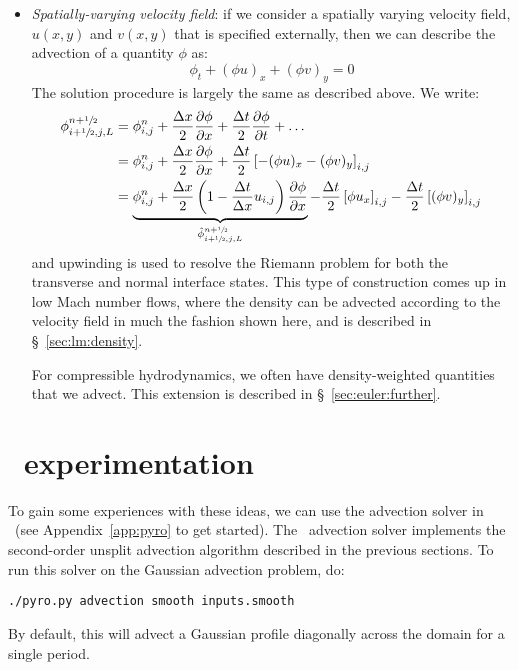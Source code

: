 \begin{itemize}
\item {\em Spatially-varying velocity field}: if we consider a spatially
  varying velocity field, $u(x,y)$ and $v(x,y)$ that is specified externally,
  then we can describe the advection of a quantity $\phi$ as:
  \begin{equation}
  \phi_t + (\phi u)_x + (\phi v)_y = 0
  \end{equation}
  The solution procedure is largely the same as described above.  We write:
\begin{align}
\phi_{i+\myhalf,j,L}^{n+\myhalf} &= \phi_{i,j}^n +
   \frac{\Delta x}{2} \frac{\partial \phi}{\partial x} +
   \frac{\Delta t}{2} \frac{\partial \phi}{\partial t} + \ldots \nonumber \\
%
 &= \phi_{i,j}^n +
    \frac{\Delta x}{2} \frac{\partial \phi}{\partial x} +
    \frac{\Delta t}{2} \left [ -(\phi u)_x -(\phi v)_y \right ]_{i,j} \nonumber\\
%
 &= \underbrace{\phi_{i,j}^n +
   \frac{\Delta x}{2} \left ( 1 - \frac{\Delta t}{\Delta x} u_{i,j} \right )
        \frac{\partial \phi}{\partial x}}_{\hat{\phi}_{i+\myhalf,j,L}^{n+\myhalf}}
   - \frac{\Delta t}{2} \left [\phi u_x \right ]_{i,j}
   - \frac{\Delta t}{2} \left [ (\phi v)_y \right ]_{i,j}
\end{align}
  and upwinding is used to resolve the Riemann problem for both the
  transverse and normal interface states.  This type of construction
  comes up in low Mach number flows, where the density can be advected
  according to the velocity field in much the fashion shown here, and
  is described in \S~\ref{sec:lm:density}.


  For compressible hydrodynamics, we often have density-weighted quantities
  that we advect.  This extension is described in \S~\ref{sec:euler:further}.

\end{itemize}


\section{\pyro\ experimentation}

To gain some experiences with these ideas, we can use the advection
solver in \pyro\ (see Appendix~\ref{app:pyro} to get started).
The \pyro\ advection solver implements the second-order unsplit
advection algorithm described in the previous sections.  To run
this solver on the Gaussian advection problem, do:
\begin{verbatim}
./pyro.py advection smooth inputs.smooth
\end{verbatim}
By default, this will advect a Gaussian profile diagonally across the
domain for a single period.

